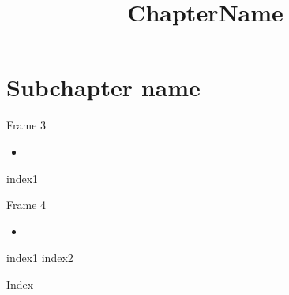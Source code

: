 \documentclass{beamer}
\begin{document}
\title{ChapterName}
\begin{frame}
{\huge \inserttitle}
\end{frame}

\section{Subchapter name}
\begin{frame}{\insertsection}
\end{frame}

\begin{frame}{Frame 3}
\begin{itemize}
\item
\end{itemize}
index1
\end{frame}

\begin{frame}{Frame 4}
\begin{itemize}
\item
\end{itemize}
index1
index2
\end{frame}

\begin{frame}{Index}
\printindex
\end{frame}
\end{document}
